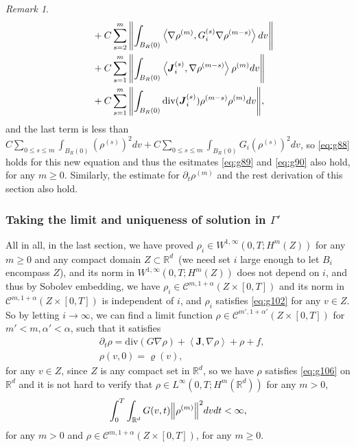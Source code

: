 \documentclass[a4paper, 11pt]{article}
\newcommand{\inner}[2]{\left< #1 , #2 \right>}
\newcounter{results}[section]
\theoremstyle{plain}
\theoremstyle{remark}
\newtheorem{remark}[results]{Remark}
\theoremstyle{definition}
\renewcommand{\div}{\mathrm{div}}
\newcommand{\intt}{\int_0^T}
\newcommand{\intr}{\int_{B_R(0)}}
\newcommand{\J}{\boldsymbol{J}}
\begin{document}
\begin{remark}
\begin{equation}
\begin{aligned}
		&\quad+C\sum_{s=2}^m\norm{\intr \inner{\nabla\rho^{(m)}}{G_i^{(s)}\nabla\rho^{(m-s)}}dv}\\
		&\quad +C\sum_{s=1}^m\norm{\intr\inner{\J_i^{(s)}}{\nabla\rho^{(m-s)}}\rho^{(m)}dv}\\
		&\quad+C\sum_{s=1}^m\norm{\intr{\div(\J_i^{(s)})}{\rho^{(m-s)}}\rho^{(m)}dv},
	\end{aligned}
\end{equation}
and the last term is less than $C\sum_{0\leq s\leq m}\intr (\rho^{(s)})^2dv+C\sum_{0\leq s\leq m}\intr G_i (\rho^{(s)})^2dv$, so \eqref{eq:g88} holds for this new equation and thus the esitmates \eqref{eq:g89} and \eqref{eq:g90}  also hold, for any $m\geq 0$. Similarly, the estimate for $\partial_t\rho^{(m)}$ and the rest derivation of this section also hold.
\end{remark}
		\subsubsection{Taking the limit and uniqueness of solution in $\Gamma'$}
		All in all,  in the last section, we have proved $\rho_i\in W^{1,\infty}(0,T; H^m(Z))$ for any $m\geq 0$ and any compact domain $Z\subset\mathbb{R}^d$~(we need set $i$ large enough to let $B_i$ encompass $Z$), and its norm in $W^{1,\infty}(0,T; H^m(Z))$ does not depend on $i$, and thus by Sobolev embedding, we have $\rho_i\in \mathcal{C}^{m,1+\alpha}(Z\times [0,T])$ and its norm in $\mathcal{C}^{m,1+\alpha}(Z\times [0,T])$ is independent of $i$, and $\rho_i$ satisfies \eqref{eq:g102} for any $v\in Z$. So by letting $i\to\infty$, we can find a limit function $\rho\in \mathcal{C}^{m',1+\alpha'}(Z\times [0,T])$ for $m'<m,\alpha'<\alpha$, such that it satisfies 
				\begin{equation}\label{eq:g106}
			\begin{aligned}	&\partial_t\rho=\div(G\nabla\rho)+\inner{\J}{\nabla\rho}+\rho+f,\\
				&\rho(v,0)=\varrho(v),
			\end{aligned}
		\end{equation}
for any $v\in Z$, since $Z$ is any compact set in $\mathbb{R}^d$, so we have $\rho$ satisfies \eqref{eq:g106} on $\mathbb{R}^d$ and it is not hard to verify that $\rho\in L^{\infty}(0,T;H^m(\mathbb{R}^d))$ for any $m>0$,
\begin{equation}
\intt\int_{\mathbb{R}^d}G(v,t)\norm{\rho^{(m)}}^2dvdt<\infty,
\end{equation}
for any $m> 0$ and $\rho\in \mathcal{C}^{m,1+\alpha}(Z\times [0,T])$, for any $m\geq 0$.
\end{document}
